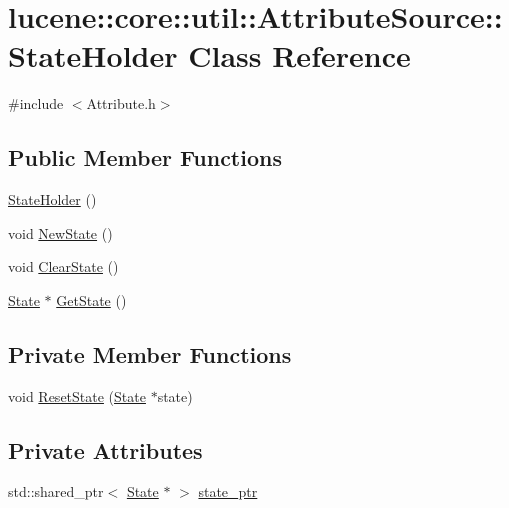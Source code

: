\hypertarget{classlucene_1_1core_1_1util_1_1AttributeSource_1_1StateHolder}{}\section{lucene\+:\+:core\+:\+:util\+:\+:Attribute\+Source\+:\+:State\+Holder Class Reference}
\label{classlucene_1_1core_1_1util_1_1AttributeSource_1_1StateHolder}


{\ttfamily \#include $<$Attribute.\+h$>$}

\subsection*{Public Member Functions}
\begin{DoxyCompactItemize}
\item 
\mbox{\hyperlink{classlucene_1_1core_1_1util_1_1AttributeSource_1_1StateHolder_a7a10250b2097309a9c2a47d667b985e0}{State\+Holder}} ()
\item 
void \mbox{\hyperlink{classlucene_1_1core_1_1util_1_1AttributeSource_1_1StateHolder_a317bf081b0546b931a86dc092d8d9f00}{New\+State}} ()
\item 
void \mbox{\hyperlink{classlucene_1_1core_1_1util_1_1AttributeSource_1_1StateHolder_a8c24d6cc62226e191f2eea91f330a849}{Clear\+State}} ()
\item 
\mbox{\hyperlink{classlucene_1_1core_1_1util_1_1AttributeSource_1_1State}{State}} $\ast$ \mbox{\hyperlink{classlucene_1_1core_1_1util_1_1AttributeSource_1_1StateHolder_aff5a7f5ea72cc4bf7b74a74d5ced6259}{Get\+State}} ()
\end{DoxyCompactItemize}
\subsection*{Private Member Functions}
\begin{DoxyCompactItemize}
\item 
void \mbox{\hyperlink{classlucene_1_1core_1_1util_1_1AttributeSource_1_1StateHolder_a093296ee1a32474162996d0b8f222994}{Reset\+State}} (\mbox{\hyperlink{classlucene_1_1core_1_1util_1_1AttributeSource_1_1State}{State}} $\ast$state)
\end{DoxyCompactItemize}
\subsection*{Private Attributes}
\begin{DoxyCompactItemize}
\item 
std\+::shared\+\_\+ptr$<$ \mbox{\hyperlink{classlucene_1_1core_1_1util_1_1AttributeSource_1_1State}{State}} $\ast$ $>$ \mbox{\hyperlink{classlucene_1_1core_1_1util_1_1AttributeSource_1_1StateHolder_ad7727b8b1f2305be0b68c4b39818037a}{state\+\_\+ptr}}
\end{DoxyCompactItemize}
